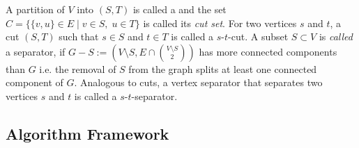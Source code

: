 \documentclass[]{article}
\begin{document}
A partition of $V$ into $(S,T)$ is called a  and the set $C = \{\{v,u\}\in E\;|\;v\in S,\; u\in T\}$ is called its \textit{cut set}. For two vertices $s$ and $t$, a cut $(S, T)$ such that $s\in S$ and $t\in T$ is called a $s$-$t$-cut. A subset $S\subset V$ is \textit{called} a separator, if $G-S := (V\setminus S, E\cap\binom{V\setminus S}{2})$ has more connected components than $G$ i.e. the removal of $S$ from the graph splits at least one connected component of $G$. Analogous to cuts, a vertex separator that separates two vertices $s$ and $t$ is called a $s$-$t$-separator.

\subsection{Algorithm Framework}
\end{document}
